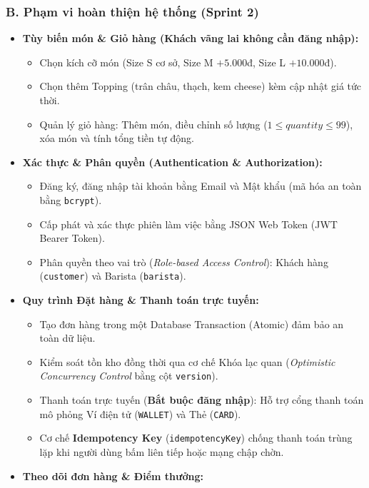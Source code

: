 \documentclass[12pt,a4paper]{article}
\begin{document}
\subsubsection{B. Phạm vi hoàn thiện hệ thống (Sprint 2)}
\begin{itemize}[leftmargin=*,itemsep=2pt]
    \item \textbf{Tùy biến món \& Giỏ hàng (Khách vãng lai không cần đăng nhập):}
    \begin{itemize}
        \item Chọn kích cỡ món (Size S cơ sở, Size M $+5.000$đ, Size L $+10.000$đ).
        \item Chọn thêm Topping (trân châu, thạch, kem cheese) kèm cập nhật giá tức thời.
        \item Quản lý giỏ hàng: Thêm món, điều chỉnh số lượng ($1 \le quantity \le 99$), xóa món và tính tổng tiền tự động.
    \end{itemize}
    \item \textbf{Xác thực \& Phân quyền (Authentication \& Authorization):}
    \begin{itemize}
        \item Đăng ký, đăng nhập tài khoản bằng Email và Mật khẩu (mã hóa an toàn bằng \texttt{bcrypt}).
        \item Cấp phát và xác thực phiên làm việc bằng JSON Web Token (JWT Bearer Token).
        \item Phân quyền theo vai trò (\textit{Role-based Access Control}): Khách hàng (\texttt{customer}) và Barista (\texttt{barista}).
    \end{itemize}
    \item \textbf{Quy trình Đặt hàng \& Thanh toán trực tuyến:}
    \begin{itemize}
        \item Tạo đơn hàng trong một Database Transaction (Atomic) đảm bảo an toàn dữ liệu.
        \item Kiểm soát tồn kho đồng thời qua cơ chế Khóa lạc quan (\textit{Optimistic Concurrency Control} bằng cột \texttt{version}).
        \item Thanh toán trực tuyến (\textbf{Bắt buộc đăng nhập}): Hỗ trợ cổng thanh toán mô phỏng Ví điện tử (\texttt{WALLET}) và Thẻ (\texttt{CARD}).
        \item Cơ chế \textbf{Idempotency Key} (\texttt{idempotencyKey}) chống thanh toán trùng lặp khi người dùng bấm liên tiếp hoặc mạng chập chờn.
    \end{itemize}
    \item \textbf{Theo dõi đơn hàng \& Điểm thưởng:}

\end{itemize}
\end{document}
